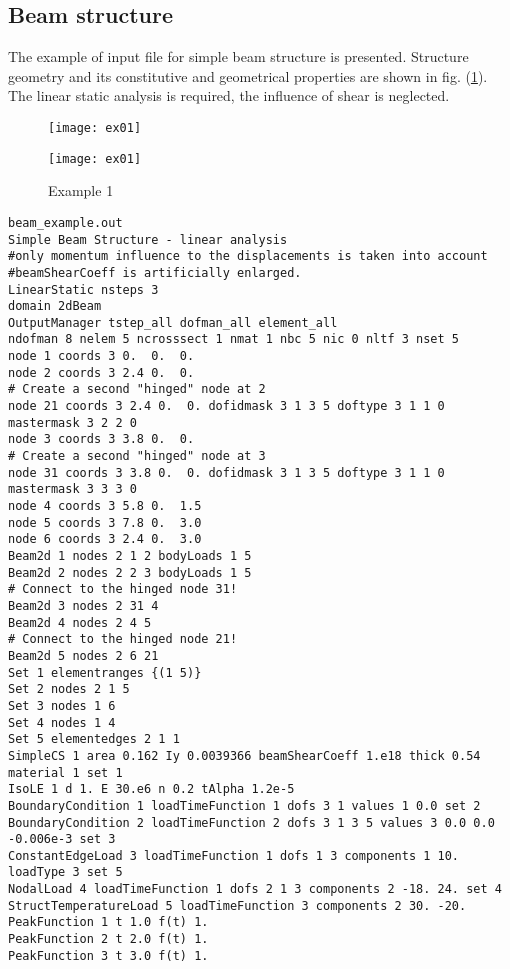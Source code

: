 \documentclass[a4paper]{article}
\begin{document}
\subsection {Beam structure}
The example of input file for simple beam structure is presented.
Structure geometry and its constitutive and geometrical properties are shown in fig. (\ref{ex01}).
The linear static analysis is required, the influence of shear is neglected.
\begin{figure}[htb]
\begin{htmlonly}
  \centerline{\texttt{[image: ex01]}}
\end{htmlonly}
\centerline{\texttt{[image: ex01]}}
\caption{Example 1}
\label{ex01}

\end{figure}
{\small\begin{verbatim}
beam_example.out
Simple Beam Structure - linear analysis
#only momentum influence to the displacements is taken into account
#beamShearCoeff is artificially enlarged.
LinearStatic nsteps 3
domain 2dBeam
OutputManager tstep_all dofman_all element_all
ndofman 8 nelem 5 ncrosssect 1 nmat 1 nbc 5 nic 0 nltf 3 nset 5
node 1 coords 3 0.  0.  0.
node 2 coords 3 2.4 0.  0.
# Create a second "hinged" node at 2
node 21 coords 3 2.4 0.  0. dofidmask 3 1 3 5 doftype 3 1 1 0 mastermask 3 2 2 0
node 3 coords 3 3.8 0.  0.
# Create a second "hinged" node at 3
node 31 coords 3 3.8 0.  0. dofidmask 3 1 3 5 doftype 3 1 1 0 mastermask 3 3 3 0
node 4 coords 3 5.8 0.  1.5
node 5 coords 3 7.8 0.  3.0
node 6 coords 3 2.4 0.  3.0
Beam2d 1 nodes 2 1 2 bodyLoads 1 5
Beam2d 2 nodes 2 2 3 bodyLoads 1 5
# Connect to the hinged node 31!
Beam2d 3 nodes 2 31 4
Beam2d 4 nodes 2 4 5
# Connect to the hinged node 21!
Beam2d 5 nodes 2 6 21
Set 1 elementranges {(1 5)}
Set 2 nodes 2 1 5
Set 3 nodes 1 6
Set 4 nodes 1 4
Set 5 elementedges 2 1 1
SimpleCS 1 area 0.162 Iy 0.0039366 beamShearCoeff 1.e18 thick 0.54 material 1 set 1
IsoLE 1 d 1. E 30.e6 n 0.2 tAlpha 1.2e-5
BoundaryCondition 1 loadTimeFunction 1 dofs 3 1 values 1 0.0 set 2
BoundaryCondition 2 loadTimeFunction 2 dofs 3 1 3 5 values 3 0.0 0.0 -0.006e-3 set 3
ConstantEdgeLoad 3 loadTimeFunction 1 dofs 1 3 components 1 10. loadType 3 set 5
NodalLoad 4 loadTimeFunction 1 dofs 2 1 3 components 2 -18. 24. set 4
StructTemperatureLoad 5 loadTimeFunction 3 components 2 30. -20.
PeakFunction 1 t 1.0 f(t) 1.
PeakFunction 2 t 2.0 f(t) 1.
PeakFunction 3 t 3.0 f(t) 1.
\end{verbatim}}
\end{document}
